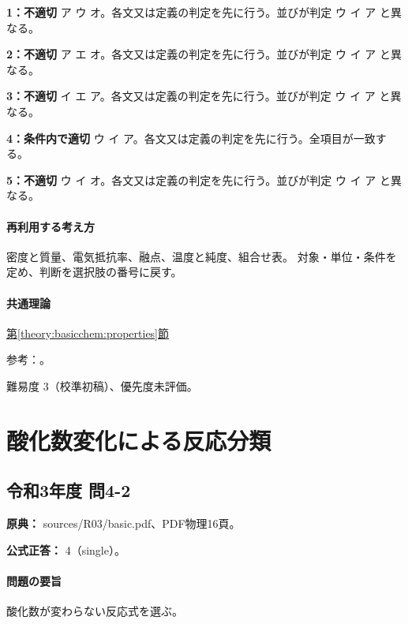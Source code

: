 \noindent\textbf{1：不適切} ア ウ オ。各文又は定義の判定を先に行う。並びが判定 ウ イ ア と異なる。\par

\noindent\textbf{2：不適切} ア エ オ。各文又は定義の判定を先に行う。並びが判定 ウ イ ア と異なる。\par

\noindent\textbf{3：不適切} イ エ ア。各文又は定義の判定を先に行う。並びが判定 ウ イ ア と異なる。\par

\noindent\textbf{4：条件内で適切} ウ イ ア。各文又は定義の判定を先に行う。全項目が一致する。\par

\noindent\textbf{5：不適切} ウ イ オ。各文又は定義の判定を先に行う。並びが判定 ウ イ ア と異なる。\par

\paragraph{再利用する考え方} 密度と質量、電気抵抗率、融点、温度と純度、組合せ表。 対象・単位・条件を定め、判断を選択肢の番号に戻す。

\paragraph{共通理論} \hyperref[theory:basicchem:properties]{第\ref*{theory:basicchem:properties}節}

\par 参考：\cite{openstax_resistivity,chem55_properties,chem55_properties_al,chem55_properties_fe}。

\par 難易度 3（校準初稿）、優先度未評価。

\section{酸化数変化による反応分類}

\subsection{令和3年度 問4-2}
\label{q:r03-reg-basic-4-2}

\noindent\textbf{原典：} sources/R03/basic.pdf、PDF物理16頁。

\textbf{公式正答：} 4（single）。

\paragraph{問題の要旨} 酸化数が変わらない反応式を選ぶ。


